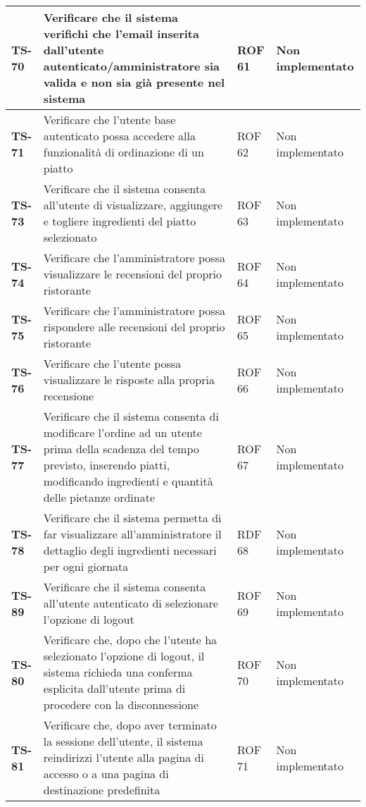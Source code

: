 \begin{longtable}{|>{\centering\arraybackslash}p{1.5cm}|p{9.8cm}|p{2cm}|p{3.5cm}|}
    \hline
    \rowcolor{gray!10}
    \textbf{TS-70} & Verificare che il sistema verifichi che l'email inserita dall'utente autenticato/amministratore sia valida e non sia già presente nel sistema & ROF 61 & Non implementato \\ 
    \hline
    \rowcolor{gray!10}
    \textbf{TS-71} & Verificare che l'utente base autenticato possa accedere alla funzionalità di ordinazione di un piatto & ROF 62 & Non implementato \\
    \hline
    \rowcolor{gray!10}
    \textbf{TS-73} & Verificare che il sistema consenta all'utente di visualizzare, aggiungere e togliere ingredienti del piatto selezionato & ROF 63 & Non implementato \\
    \hline
    \rowcolor{gray!10}
    \textbf{TS-74} & Verificare che l'amministratore possa visualizzare le recensioni del proprio ristorante & ROF 64 & Non implementato \\ 
    \hline
    \rowcolor{gray!10}
    \textbf{TS-75} & Verificare che l'amministratore possa rispondere alle recensioni del proprio ristorante & ROF 65 & Non implementato \\ 
    \hline
    \rowcolor{gray!10}
    \textbf{TS-76} & Verificare che l'utente possa visualizzare le risposte alla propria recensione & ROF 66 & Non implementato \\
    \hline
    \rowcolor{gray!10}
    \textbf{TS-77} & Verificare che il sistema consenta di modificare l'ordine ad un utente prima della scadenza del tempo previsto, inserendo piatti, modificando ingredienti e quantità delle pietanze ordinate & ROF 67 & Non implementato \\ 
    \hline
    \rowcolor{gray!10}
    \textbf{TS-78} & Verificare che il sistema permetta di far visualizzare all'amministratore il dettaglio degli ingredienti necessari per ogni giornata & RDF 68 & Non implementato \\ 
    \hline
    \rowcolor{gray!10}
    \textbf{TS-89} & Verificare che il sistema consenta all'utente autenticato di selezionare l'opzione di logout & ROF 69 & Non implementato \\
    \hline
    \rowcolor{gray!10}
    \textbf{TS-80} & Verificare che, dopo che l'utente ha selezionato l'opzione di logout, il sistema richieda una conferma esplicita dall'utente prima di procedere con la disconnessione & ROF 70 & Non implementato \\ 
    \hline
    \rowcolor{gray!10}
    \textbf{TS-81} & Verificare che, dopo aver terminato la sessione dell'utente, il sistema reindirizzi l'utente alla pagina di accesso o a una pagina di destinazione predefinita & ROF 71 & Non implementato \\ 

\end{longtable}
